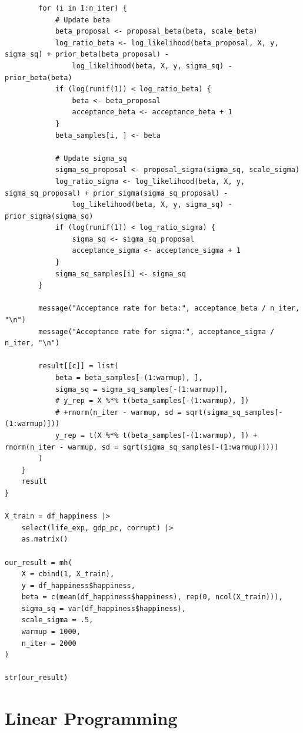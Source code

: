 \documentclass[
  letterpaper,
]{krantz}
\begin{document}
\begin{verbatim}
        for (i in 1:n_iter) {
            # Update beta
            beta_proposal <- proposal_beta(beta, scale_beta)
            log_ratio_beta <- log_likelihood(beta_proposal, X, y, sigma_sq) + prior_beta(beta_proposal) -
                log_likelihood(beta, X, y, sigma_sq) - prior_beta(beta)
            if (log(runif(1)) < log_ratio_beta) {
                beta <- beta_proposal
                acceptance_beta <- acceptance_beta + 1
            }
            beta_samples[i, ] <- beta

            # Update sigma_sq
            sigma_sq_proposal <- proposal_sigma(sigma_sq, scale_sigma)
            log_ratio_sigma <- log_likelihood(beta, X, y, sigma_sq_proposal) + prior_sigma(sigma_sq_proposal) -
                log_likelihood(beta, X, y, sigma_sq) - prior_sigma(sigma_sq)
            if (log(runif(1)) < log_ratio_sigma) {
                sigma_sq <- sigma_sq_proposal
                acceptance_sigma <- acceptance_sigma + 1
            }
            sigma_sq_samples[i] <- sigma_sq
        }
    
        message("Acceptance rate for beta:", acceptance_beta / n_iter, "\n")
        message("Acceptance rate for sigma:", acceptance_sigma / n_iter, "\n")

        result[[c]] = list(
            beta = beta_samples[-(1:warmup), ], 
            sigma_sq = sigma_sq_samples[-(1:warmup)],
            # y_rep = X %*% t(beta_samples[-(1:warmup), ])
            # +rnorm(n_iter - warmup, sd = sqrt(sigma_sq_samples[-(1:warmup)]))
            y_rep = t(X %*% t(beta_samples[-(1:warmup), ]) + rnorm(n_iter - warmup, sd = sqrt(sigma_sq_samples[-(1:warmup)])))
        )
    } 
    result
}

X_train = df_happiness |>
    select(life_exp, gdp_pc, corrupt) |>
    as.matrix()

our_result = mh(
    X = cbind(1, X_train),
    y = df_happiness$happiness, 
    beta = c(mean(df_happiness$happiness), rep(0, ncol(X_train))),
    sigma_sq = var(df_happiness$happiness),
    scale_sigma = .5,
    warmup = 1000,
    n_iter = 2000
)

str(our_result)
\end{verbatim}

\section{Linear Programming}\label{linear-programming}
\end{document}
